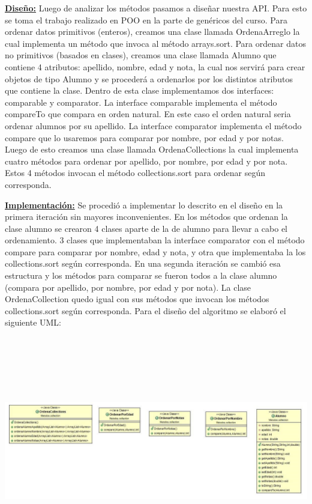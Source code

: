 \documentclass[12pt,letterpaper]{article}
\begin{document}
{\bf\underline {Diseño:}} Luego de analizar los métodos pasamos a diseñar nuestra API. Para esto se toma
el trabajo realizado en POO en la parte de genéricos del curso.
\vskip 0.4cm
Para ordenar datos primitivos (enteros), creamos una clase llamada OrdenaArreglo la cual
implementa un método que invoca al método arrays.sort.
\vskip 0.4cm
Para ordenar datos no primitivos (basados en clases), creamos una clase llamada Alumno
que contiene 4 atributos: apellido, nombre, edad y nota, la cual nos servirá para crear
objetos de tipo Alumno y se procederá a ordenarlos por los distintos atributos que
contiene la clase. Dentro de esta clase implementamos dos interfaces: comparable y
comparator. La interface comparable implementa el método compareTo que compara en
orden natural. En este caso el orden natural seria ordenar alumnos por su apellido. La
interface comparator implementa el método compare que lo usaremos para comparar por
nombre, por edad y por notas. Luego de esto creamos una clase llamada
OrdenaCollections la cual implementa cuatro métodos para ordenar por apellido, por
nombre, por edad y por nota. Estos 4 métodos invocan el método collections.sort para
ordenar según corresponda.
\vskip 0.4cm

{\bf\underline{Implementación:}} Se procedió a implementar lo descrito en el diseño en la primera
iteración sin mayores inconvenientes. En los métodos que ordenan la clase alumno se
crearon 4 clases aparte de la de alumno para llevar a cabo el ordenamiento. 3 clases que
implementaban la interface comparator con el método compare para comparar por
nombre, edad y nota, y otra que implementaba la los collections.sort según corresponda.
\vskip 0.4cm
En una segunda iteración se cambió esa estructura y los métodos para comparar se fueron
todos a la clase alumno (compara por apellido, por nombre, por edad y por nota). La clase
OrdenaCollection quedo igual con sus métodos que invocan los métodos collections.sort
según corresponda.
\vskip 0.4cm
Para el diseño del algoritmo se elaboró el siguiente UML:
\vskip 0.2cm
\begin{flushright}
\includegraphics[width=18cm,height=10cm]{Imagen8}
\end{flushright} 
\newpage
\end{document}
